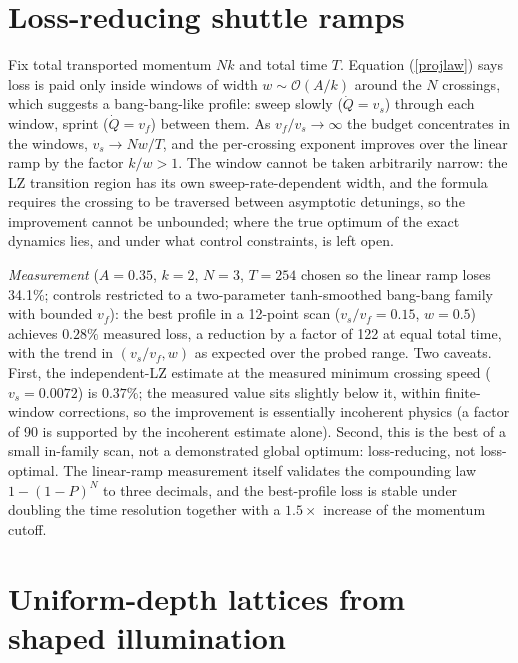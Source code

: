 \documentclass[aps,prb,floatfix,amsmath,amssymb,groupedaddress]{revtex4}
\begin{document}
\section{Loss-reducing shuttle ramps}

Fix total transported momentum $Nk$ and total time $T$. Equation
(\ref{projlaw}) says loss is paid only inside windows of width
$w \sim \mathcal{O}(A/k)$ around the $N$ crossings, which suggests a bang-bang-like profile: sweep slowly
($\dot Q = v_s$) through each window, sprint ($\dot Q = v_f$) between them.
As $v_f/v_s \to \infty$ the budget concentrates in the windows,
$v_s \to N w / T$, and the per-crossing exponent improves over the linear
ramp by the factor $k/w > 1$. The window cannot be taken arbitrarily narrow:
the LZ transition region has its own sweep-rate-dependent width, and the
formula requires the crossing to be traversed between asymptotic detunings,
so the improvement cannot be unbounded; where the true optimum of the exact
dynamics lies, and under what control constraints, is left open.

\emph{Measurement} ($A = 0.35$, $k = 2$, $N = 3$, $T = 254$ chosen so the
linear ramp loses 34.1\%; controls restricted to a two-parameter
tanh-smoothed bang-bang family with bounded $v_f$): the best profile in a
12-point scan ($v_s/v_f = 0.15$, $w = 0.5$) achieves $0.28\%$ measured loss,
a reduction by a factor of 122 at equal total time, with the trend in
$(v_s/v_f, w)$ as expected over the probed range. Two caveats. First, the
independent-LZ estimate at the measured minimum crossing speed
($v_s = 0.0072$) is $0.37\%$; the measured value sits slightly below it,
within finite-window corrections, so the improvement is essentially
incoherent physics (a factor of 90 is supported by the incoherent estimate
alone). Second, this is the best of a small in-family scan, not a
demonstrated global optimum: loss-reducing, not loss-optimal.
The linear-ramp measurement itself validates the compounding law
$1-(1-P)^N$ to three decimals, and the best-profile loss is stable under
doubling the time resolution together with a $1.5\times$ increase of the
momentum cutoff.

\section{Uniform-depth lattices from shaped illumination}
\end{document}
